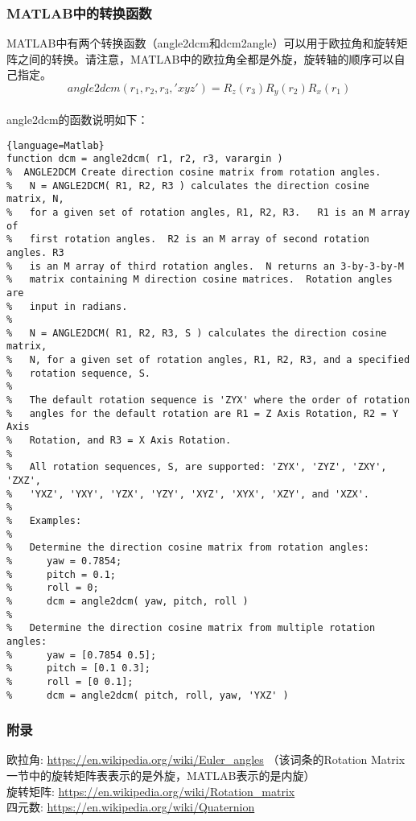 \documentclass{ctexart}
\begin{document}
	\subsubsection{MATLAB中的转换函数}
	MATLAB中有两个转换函数（angle2dcm和dcm2angle）可以用于欧拉角和旋转矩阵之间的转换。请注意，MATLAB中的欧拉角全都是外旋，旋转轴的顺序可以自己指定。
	\\\indent
	\begin{equation}
		angle2dcm(r_1,r_2,r_3,'xyz')=R_z(r_3) R_y(r_2) R_x(r_1)
	\end{equation}
	\\\indent
	angle2dcm的函数说明如下：
	\small
	\begin{lstlisting}{language=Matlab}
function dcm = angle2dcm( r1, r2, r3, varargin )
%  ANGLE2DCM Create direction cosine matrix from rotation angles.
%   N = ANGLE2DCM( R1, R2, R3 ) calculates the direction cosine matrix, N,
%   for a given set of rotation angles, R1, R2, R3.   R1 is an M array of
%   first rotation angles.  R2 is an M array of second rotation angles. R3
%   is an M array of third rotation angles.  N returns an 3-by-3-by-M
%   matrix containing M direction cosine matrices.  Rotation angles are
%   input in radians.  
%
%   N = ANGLE2DCM( R1, R2, R3, S ) calculates the direction cosine matrix,
%   N, for a given set of rotation angles, R1, R2, R3, and a specified
%   rotation sequence, S. 
%
%   The default rotation sequence is 'ZYX' where the order of rotation
%   angles for the default rotation are R1 = Z Axis Rotation, R2 = Y Axis
%   Rotation, and R3 = X Axis Rotation. 
%
%   All rotation sequences, S, are supported: 'ZYX', 'ZYZ', 'ZXY', 'ZXZ',
%   'YXZ', 'YXY', 'YZX', 'YZY', 'XYZ', 'XYX', 'XZY', and 'XZX'.
%
%   Examples:
%
%   Determine the direction cosine matrix from rotation angles:
%      yaw = 0.7854; 
%      pitch = 0.1; 
%      roll = 0;
%      dcm = angle2dcm( yaw, pitch, roll )
%
%   Determine the direction cosine matrix from multiple rotation angles:
%      yaw = [0.7854 0.5]; 
%      pitch = [0.1 0.3]; 
%      roll = [0 0.1];
%      dcm = angle2dcm( pitch, roll, yaw, 'YXZ' )
	\end{lstlisting}
	
	\subsubsection{附录}
	欧拉角: \url{https://en.wikipedia.org/wiki/Euler_angles}
	（该词条的Rotation Matrix一节中的旋转矩阵表表示的是外旋，MATLAB表示的是内旋）
	\\\indent
	旋转矩阵: \url{https://en.wikipedia.org/wiki/Rotation_matrix}
	\\\indent
	四元数: \url{https://en.wikipedia.org/wiki/Quaternion}
	
\end{document}
